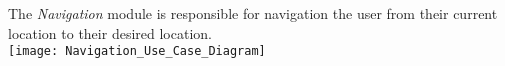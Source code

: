 The \textit{Navigation} module is responsible for navigation the user from their current location to their desired location.  \\
\texttt{[image: Navigation\_Use\_Case\_Diagram]}